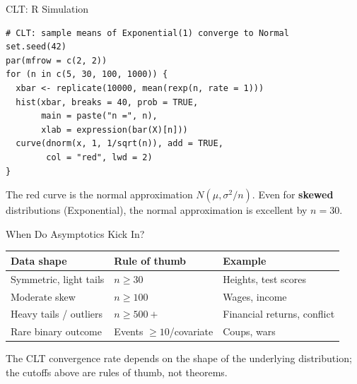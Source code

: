 \documentclass[handout, aspectratio=169]{beamer}
\numberwithin{equation}{section}
\begin{document}

\begin{frame}[fragile]{CLT: R Simulation}

\begin{lstlisting}
# CLT: sample means of Exponential(1) converge to Normal
set.seed(42)
par(mfrow = c(2, 2))
for (n in c(5, 30, 100, 1000)) {
  xbar <- replicate(10000, mean(rexp(n, rate = 1)))
  hist(xbar, breaks = 40, prob = TRUE,
       main = paste("n =", n),
       xlab = expression(bar(X)[n]))
  curve(dnorm(x, 1, 1/sqrt(n)), add = TRUE,
        col = "red", lwd = 2)
}
\end{lstlisting}

\pause

The red curve is the normal approximation $N(\mu, \sigma^2/n)$. Even for \textbf{skewed} distributions (Exponential), the normal approximation is excellent by $n = 30$.

\end{frame}


\begin{frame}{When Do Asymptotics Kick In?}

\begin{center}
\renewcommand{\arraystretch}{1.4}
\begin{tabular}{>{\raggedright}p{3.5cm} l l}
\toprule
\textbf{Data shape} & \textbf{Rule of thumb} & \textbf{Example} \\
\midrule
Symmetric, light tails & $n \geq 30$ & Heights, test scores \\
Moderate skew & $n \geq 100$ & Wages, income \\
Heavy tails / outliers & $n \geq 500{+}$ & Financial returns, conflict \\
Rare binary outcome & Events $\geq 10$/covariate & Coups, wars \\
\bottomrule
\end{tabular}
\renewcommand{\arraystretch}{1.0}
\end{center}

\pause

\begin{tcolorbox}[colback=blue!5, colframe=blue!50]
The CLT convergence rate depends on the shape of the underlying distribution; the cutoffs above are rules of thumb, not theorems.
\end{tcolorbox}

\end{frame}
\end{document}
